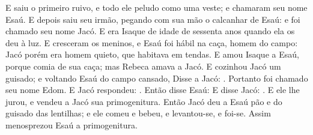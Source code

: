 {{E saiu o primeiro ruivo, e todo ele peludo como uma veste; e chamaram seu nome Esaú.
E depois saiu seu irmão, pegando com sua mão o calcanhar de Esaú: e foi chamado seu nome Jacó. E era Isaque de idade de sessenta anos quando ela os deu à luz.
E cresceram os meninos, e Esaú foi hábil na caça, homem do campo: Jacó porém era homem quieto, que habitava em tendas.
E amou Isaque a Esaú, porque comia de sua caça; mas Rebeca amava a Jacó.
E cozinhou Jacó um guisado; e voltando Esaú do campo cansado,
Disse a Jacó: . Portanto foi chamado seu nome Edom.
E Jacó respondeu: .
Então disse Esaú: 
E disse Jacó: . E ele lhe jurou, e vendeu a Jacó sua primogenitura.
Então Jacó deu a Esaú pão e do guisado das lentilhas; e ele comeu e bebeu, e levantou-se, e foi-se. Assim menosprezou Esaú a primogenitura.

\par}

}
